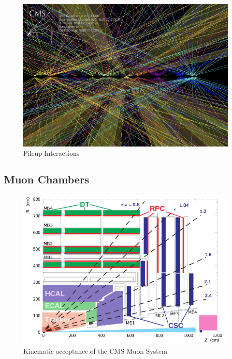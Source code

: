 \begin{figure}
\begin{center}
\includegraphics[width=.75\textwidth]{pics/pileup_vertices}
\end{center}
\caption{Pileup Interactions}
\label{fig:pileup}
\end{figure}

\subsection{Muon Chambers}

\begin{figure}
\begin{center}
\includegraphics[width=.85\textwidth]{pics/muon_diagram}
\end{center}
\caption{Kinematic acceptance of the CMS Muon System}
\label{fig:muon_diagram}
\end{figure}

